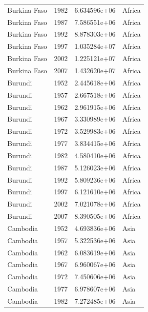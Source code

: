 \documentclass[
  letterpaper,
  DIV=11,
  numbers=noendperiod]{scrreprt}
\begin{document}
\begin{tcolorbox}
\begin{tabular}{lrrl}
Burkina Faso             &  1982 &  6.634596e+06 &    Africa \\
Burkina Faso             &  1987 &  7.586551e+06 &    Africa \\
Burkina Faso             &  1992 &  8.878303e+06 &    Africa \\
Burkina Faso             &  1997 &  1.035284e+07 &    Africa \\
Burkina Faso             &  2002 &  1.225121e+07 &    Africa \\
Burkina Faso             &  2007 &  1.432620e+07 &    Africa \\
Burundi                  &  1952 &  2.445618e+06 &    Africa \\
Burundi                  &  1957 &  2.667518e+06 &    Africa \\
Burundi                  &  1962 &  2.961915e+06 &    Africa \\
Burundi                  &  1967 &  3.330989e+06 &    Africa \\
Burundi                  &  1972 &  3.529983e+06 &    Africa \\
Burundi                  &  1977 &  3.834415e+06 &    Africa \\
Burundi                  &  1982 &  4.580410e+06 &    Africa \\
Burundi                  &  1987 &  5.126023e+06 &    Africa \\
Burundi                  &  1992 &  5.809236e+06 &    Africa \\
Burundi                  &  1997 &  6.121610e+06 &    Africa \\
Burundi                  &  2002 &  7.021078e+06 &    Africa \\
Burundi                  &  2007 &  8.390505e+06 &    Africa \\
Cambodia                 &  1952 &  4.693836e+06 &      Asia \\
Cambodia                 &  1957 &  5.322536e+06 &      Asia \\
Cambodia                 &  1962 &  6.083619e+06 &      Asia \\
Cambodia                 &  1967 &  6.960067e+06 &      Asia \\
Cambodia                 &  1972 &  7.450606e+06 &      Asia \\
Cambodia                 &  1977 &  6.978607e+06 &      Asia \\
Cambodia                 &  1982 &  7.272485e+06 &      Asia \\

\end{tabular}
\end{tcolorbox}
\end{document}
